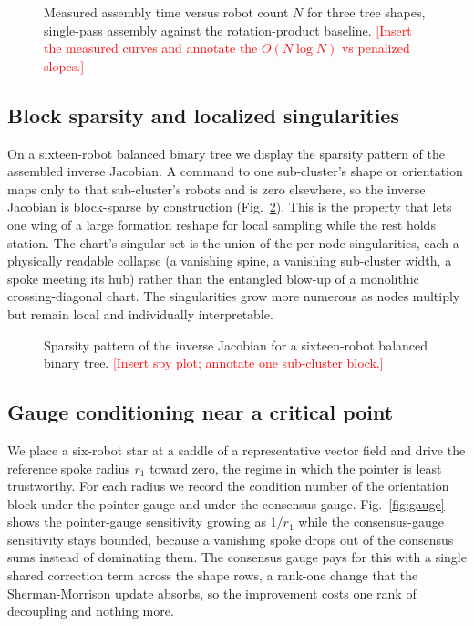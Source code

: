\documentclass[conference]{IEEEtran}
\newcommand{\fillnote}[1]{\textcolor{red}{[#1]}} %
\begin{document}
\begin{figure}[t]
\centering
\framebox[0.9\linewidth]{\rule{0pt}{3.0cm} \fillnote{Fig: assembly time vs $N$ for flat / balanced / chain, this work vs prior baseline}}
\caption{Measured assembly time versus robot count $N$ for three tree shapes,
single-pass assembly against the rotation-product baseline. \fillnote{Insert the
measured curves and annotate the $O(N\log N)$ vs penalized slopes.}}
\label{fig:scaling}
\end{figure}

\subsection{Block sparsity and localized singularities}
On a sixteen-robot balanced binary tree we display the sparsity pattern of the
assembled inverse Jacobian. A command to one sub-cluster's shape or orientation
maps only to that sub-cluster's robots and is zero elsewhere, so the inverse
Jacobian is block-sparse by construction (Fig.~\ref{fig:sparsity}). This is the
property that lets one wing of a large formation reshape for local sampling while
the rest holds station. The chart's singular set is the union of the per-node
singularities, each a physically readable collapse (a vanishing spine, a
vanishing sub-cluster width, a spoke meeting its hub) rather than the entangled
blow-up of a monolithic crossing-diagonal chart. The singularities grow more
numerous as nodes multiply but remain local and individually interpretable.

\begin{figure}[t]
\centering
\framebox[0.9\linewidth]{\rule{0pt}{3.0cm} \fillnote{Fig: spy plot of the 16-robot inverse Jacobian showing block structure}}
\caption{Sparsity pattern of the inverse Jacobian for a sixteen-robot balanced
binary tree. \fillnote{Insert spy plot; annotate one sub-cluster block.}}
\label{fig:sparsity}
\end{figure}

\subsection{Gauge conditioning near a critical point}
We place a six-robot star at a saddle of a representative vector field and drive
the reference spoke radius $r_1$ toward zero, the regime in which the pointer is
least trustworthy. For each radius we record the condition number of the
orientation block under the pointer gauge and under the consensus gauge.
Fig.~\ref{fig:gauge} shows the pointer-gauge sensitivity growing as $1/r_1$ while
the consensus-gauge sensitivity stays bounded, because a vanishing spoke drops
out of the consensus sums instead of dominating them. The consensus gauge pays
for this with a single shared correction term across the shape rows, a rank-one
change that the Sherman-Morrison update absorbs, so the improvement costs one rank
of decoupling and nothing more.
\end{document}
